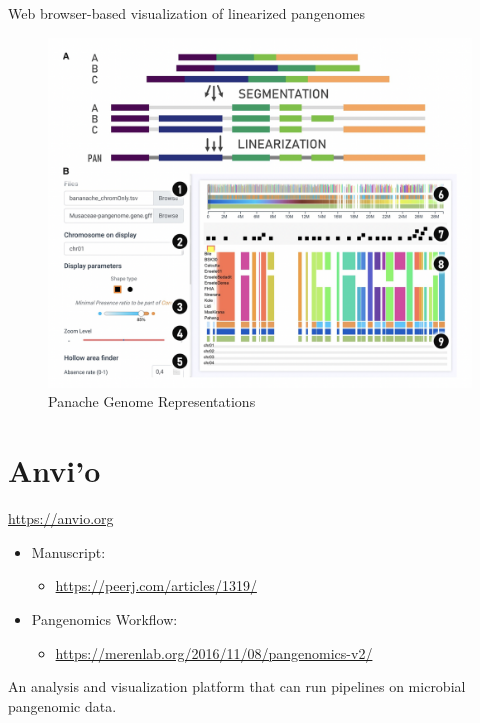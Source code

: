 \documentclass[
]{book}
\providecommand{\tightlist}{%
  \setlength{\itemsep}{0pt}\setlength{\parskip}{0pt}}
\begin{document}
Web browser-based visualization of linearized pangenomes

\begin{figure}
\centering
\includegraphics[width=1\textwidth,height=\textheight]{./Figures/Panache.png}
\caption{Panache Genome Representations}
\end{figure}

\hypertarget{anvio}{%
\section{Anvi'o}\label{anvio}}

\url{https://anvio.org}

\begin{itemize}
\tightlist
\item
  Manuscript:

  \begin{itemize}
  \tightlist
  \item
    \url{https://peerj.com/articles/1319/}
  \end{itemize}
\item
  Pangenomics Workflow:

  \begin{itemize}
  \tightlist
  \item
    \url{https://merenlab.org/2016/11/08/pangenomics-v2/}
  \end{itemize}
\end{itemize}

An analysis and visualization platform that can run pipelines on microbial pangenomic data.
\end{document}

